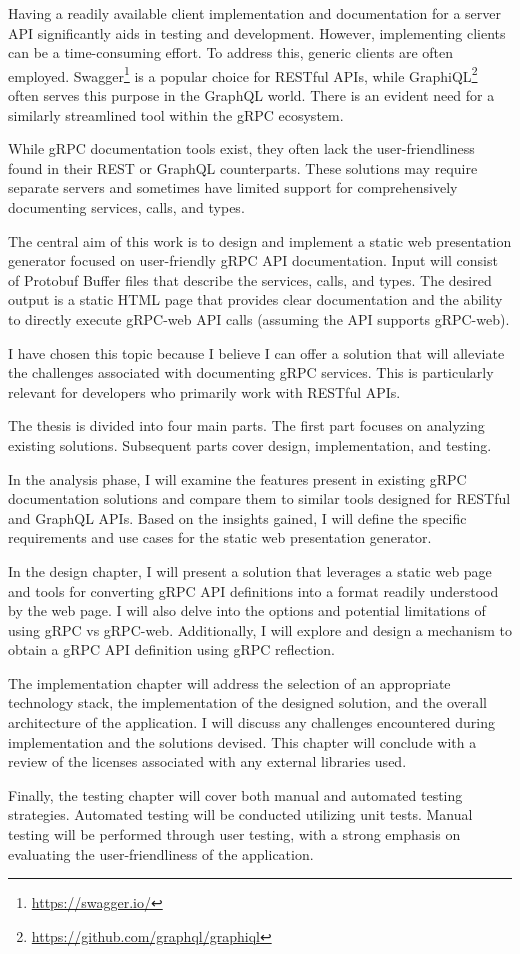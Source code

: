 Having a readily available client implementation and documentation for a server API significantly aids in testing and development.
However, implementing clients can be a time-consuming effort.
To address this, generic clients are often employed.
Swagger\footnote{\url{https://swagger.io/}} is a popular choice for RESTful APIs, while GraphiQL\footnote{\url{https://github.com/graphql/graphiql}} often serves this purpose in the GraphQL world.
There is an evident need for a similarly streamlined tool within the gRPC ecosystem.

While gRPC documentation tools exist, they often lack the user-friendliness found in their REST or GraphQL counterparts.
These solutions may require separate servers and sometimes have limited support for comprehensively documenting services, calls, and types.

The central aim of this work is to design and implement a static web presentation generator focused on user-friendly gRPC API documentation.
Input will consist of Protobuf Buffer files that describe the services, calls, and types.
The desired output is a static HTML page that provides clear documentation and the ability to directly execute gRPC-web API calls (assuming the API supports gRPC-web).

I have chosen this topic because I believe I can offer a solution that will alleviate the challenges associated with documenting gRPC services.
This is particularly relevant for developers who primarily work with RESTful APIs.

The thesis is divided into four main parts.
The first part focuses on analyzing existing solutions.
Subsequent parts cover design, implementation, and testing.

In the analysis phase, I will examine the features present in existing gRPC documentation solutions and compare them to similar tools designed for RESTful and GraphQL APIs.
Based on the insights gained, I will define the specific requirements and use cases for the static web presentation generator.

In the design chapter, I will present a solution that leverages a static web page and tools for converting gRPC API definitions into a format readily understood by the web page.
I will also delve into the options and potential limitations of using gRPC vs gRPC-web.
Additionally, I will explore and design a mechanism to obtain a gRPC API definition using gRPC reflection.

The implementation chapter will address the selection of an appropriate technology stack, the implementation of the designed solution, and the overall architecture of the application.
I will discuss any challenges encountered during implementation and the solutions devised.
This chapter will conclude with a review of the licenses associated with any external libraries used.

Finally, the testing chapter will cover both manual and automated testing strategies.
Automated testing will be conducted utilizing unit tests.
Manual testing will be performed through user testing, with a strong emphasis on evaluating the user-friendliness of the application.